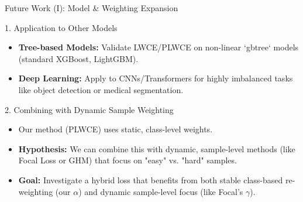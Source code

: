 \documentclass[aspectratio=169]{beamer}
\def \bblock{\begin{beamerboxesrounded}[upper=uppercolor,lower=lowercolor,shadow=true]}
\def \eblock{\end{beamerboxesrounded}}
\begin{document}
\begin{frame}{Future Work (I): Model \& Weighting Expansion}

\vspace{0.03\textwidth}

\bblock{1. Application to Other Models}
    \begin{itemize}
        \item \textbf{Tree-based Models:} Validate LWCE/PLWCE on non-linear `gbtree` models (standard XGBoost, LightGBM).
        \vfill
        \item \textbf{Deep Learning:} Apply to CNNs/Transformers for highly imbalanced tasks like object detection or medical segmentation.
    \end{itemize}
\eblock

\vspace{0.01\textwidth}

\bblock{2. Combining with Dynamic Sample Weighting}
    \begin{itemize}
        \item Our method (PLWCE) uses \alert{static, class-level} weights.
        \vfill
        \item \textbf{Hypothesis:} We can combine this with \alert{dynamic, sample-level} methods (like Focal Loss or GHM) that focus on "easy" vs. "hard" samples.
        \vfill
        \item \textbf{Goal:} Investigate a hybrid loss that benefits from both stable class-based re-weighting (our $\alpha$) and dynamic sample-level focus (like Focal's $\gamma$).
    \end{itemize}
\eblock

\end{frame}
\end{document}
